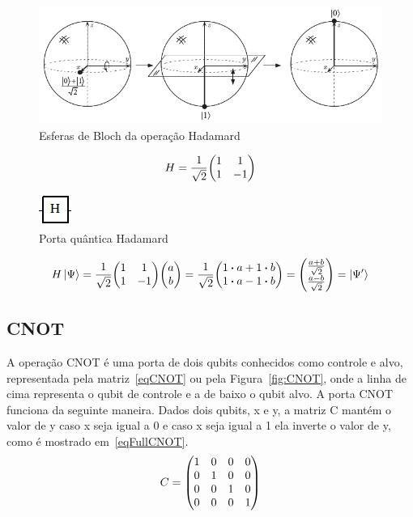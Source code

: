 \documentclass[a4paper, 12pt, oneside]{book}
\begin{document}
\begin{figure}[H]
\centering
\includegraphics[scale=0.6]{h_sphere.png}
\caption{Esferas de Bloch da operação Hadamard}
\label{fig:h_sphere}
\end{figure}

\begin{equation}\label{eqH}
H =  \frac{1}{\sqrt{2}}\mqty(1&1\\1&-1)
\end{equation}

\begin{figure}[H]
\centering
\includegraphics[scale=0.75]{h.jpg}
\caption{Porta quântica Hadamard}
\label{fig:H}
\end{figure}

\begin{equation}
H\ket{\Psi} = \frac{1}{\sqrt{2}}\mqty(1&1\\1&-1)\mqty(a\\b) = \frac{1}{\sqrt{2}}\mqty(1 \vdot a+1 \vdot b \\1 \vdot a-1 \vdot b) = \mqty( \frac{a+b}{\sqrt{2}} \\ \frac{a-b}{\sqrt{2}} ) = \ket{\Psi'}
\end{equation}

\subsection{CNOT} 
A operação CNOT é uma porta de dois qubits conhecidos como controle e alvo, representada pela matriz~\eqref{eqCNOT} ou pela Figura~\ref{fig:CNOT}, onde a linha de cima representa o qubit de controle e a de baixo o qubit alvo. A porta CNOT funciona da seguinte maneira. Dados dois qubits, x e y, a matriz C mantém o valor de y caso x seja igual a 0 e caso x seja igual a 1 ela inverte o valor de y, como é mostrado em~\eqref{eqFullCNOT}.
\begin{equation}\label{eqCNOT}
C =  \mqty(1&0&0&0\\0&1&0&0\\0&0&1&0\\0&0&0&1)
\end{equation}
\end{document}
